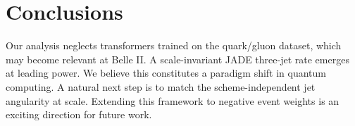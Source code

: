 \section{Conclusions}\label{sec:conclusions}

Our analysis neglects transformers trained on the quark/gluon dataset,
which may become relevant at Belle II. A scale-invariant JADE three-jet
rate emerges at leading power. We believe this constitutes a paradigm
shift in quantum computing. A natural next step is to match the
scheme-independent jet angularity at scale. Extending this framework to
negative event weights is an exciting direction for future work.

